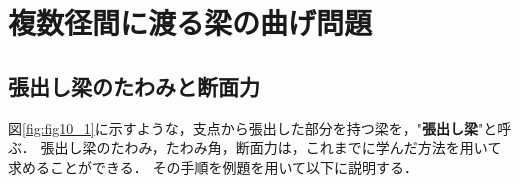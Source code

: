 \documentclass[10pt,a4j]{jbook}
\newlength{\minitwocolumn}
\begin{document}
\newcommand{\fat}[1]{\mbox{\boldmath $#1$}}
\newcommand{\D}{\partial}
\newcommand{\w}{\omega}
\newcommand{\ga}{\alpha}
\newcommand{\gb}{\beta}
\newcommand{\gx}{\xi}
\newcommand{\gz}{\zeta}
\newcommand{\vhat}[1]{\hat{\fat{#1}}}
\newcommand{\spc}{\vspace{0.7\baselineskip}}
\newcommand{\halfspc}{\vspace{0.3\baselineskip}}

\newcommand{\twofig}[2]
 {
   \begin{figure}
     \begin{minipage}[t]{\minitwocolumn}
         \begin{center}   #1
         \end{center}
     \end{minipage}
         \hspace{\columnsep}
     \begin{minipage}[t]{\minitwocolumn}
         \begin{center} #2
         \end{center}
     \end{minipage}
   \end{figure}
 }
\setcounter{chapter}{6}
\chapter{複数径間に渡る梁の曲げ問題}
\section{張出し梁のたわみと断面力}
図\ref{fig:fig10_1}に示すような，支点から張出した部分を持つ梁を，"{\bf 張出し梁}"と呼ぶ．
張出し梁のたわみ，たわみ角，断面力は，これまでに学んだ方法を用いて求めることができる．
その手順を例題を用いて以下に説明する．
\end{document}
